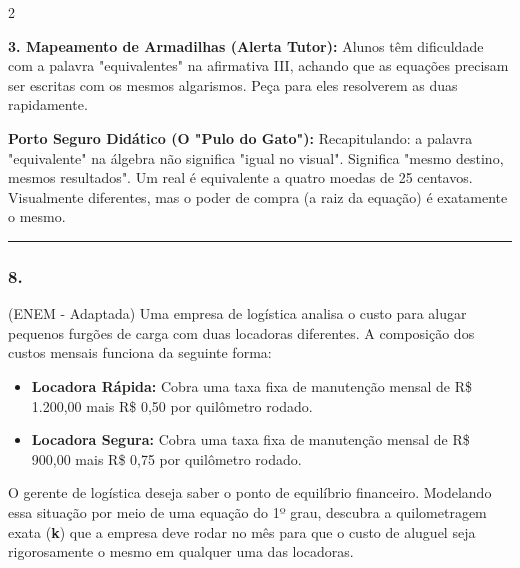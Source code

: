 \begin{multicols*}{2}
\begin{tcolorbox}[colback=CorTitUm!5, colframe=CorTitUm, boxrule=1pt, arc=4pt, left=6pt, right=6pt, top=6pt, bottom=6pt]
    \textbf{3. Mapeamento de Armadilhas (Alerta Tutor):} Alunos têm dificuldade com a palavra "equivalentes" na afirmativa III, achando que as equações precisam ser escritas com os mesmos algarismos. Peça para eles resolverem as duas rapidamente.
    \end{tcolorbox}
    \vspace{0.15cm}
    
    \begin{boxexplicacao}
    \textbf{Porto Seguro Didático (O "Pulo do Gato"):} Recapitulando: a palavra "equivalente" na álgebra não significa "igual no visual". Significa "mesmo destino, mesmos resultados". Um real é equivalente a quatro moedas de 25 centavos. Visualmente diferentes, mas o poder de compra (a raiz da equação) é exatamente o mesmo.
    \end{boxexplicacao}
\fi

\par\vspace{\espacoQuestao}


\noindent\textcolor{CorLinha}{\rule{\linewidth}{0.5pt}} 
\par\vspace{\espacoPreQuestao}
\subsubsection*{8.} 
\begin{enunciadoLiteral}
(ENEM - Adaptada) Uma empresa de logística analisa o custo para alugar pequenos furgões de carga com duas locadoras diferentes. A composição dos custos mensais funciona da seguinte forma:

\begin{itemize}[itemsep=\espacoAlt]
\item \textbf{Locadora Rápida:} Cobra uma taxa fixa de manutenção mensal de R\$ 1.200,00 mais R\$ 0,50 por quilômetro rodado.
\item \textbf{Locadora Segura:} Cobra uma taxa fixa de manutenção mensal de R\$ 900,00 mais R\$ 0,75 por quilômetro rodado.
\end{itemize}

O gerente de logística deseja saber o ponto de equilíbrio financeiro. Modelando essa situação por meio de uma equação do 1º grau, descubra a quilometragem exata (\textbf{k}) que a empresa deve rodar no mês para que o custo de aluguel seja rigorosamente o mesmo em qualquer uma das locadoras.
\end{enunciadoLiteral}


\end{multicols*}
